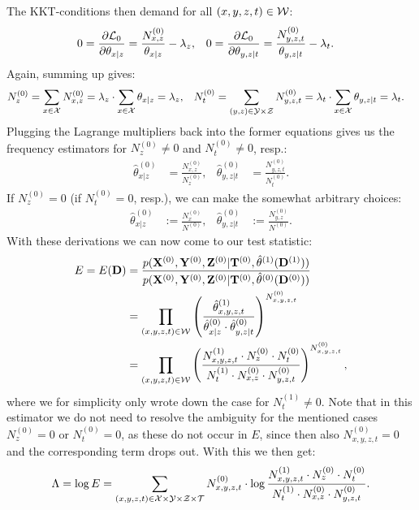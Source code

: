 The KKT-conditions then demand for all $(x,y,z,t) \in \mathcal{W}$:
\begin{align*}
    0= \frac{\partial \mathcal{L}_0}{\partial\theta_{x|z}} &= \frac{N_{x,z}^{(0)}}{\theta_{x|z}}  - \lambda_z, &
    0= \frac{\partial \mathcal{L}_0}{\partial\theta_{y,z|t}} &= \frac{N_{y,z,t}^{(0)}}{\theta_{y,z|t}}  - \lambda_t.
\end{align*}
Again, summing up gives:
\begin{align*}
    N_z^{(0)} &= \sum_{x \in \mathcal{X}} N_{x,z}^{(0)} = \lambda_z \cdot \sum_{x \in \mathcal{X}} \theta_{x|z} = \lambda_z, &
    N_t^{(0)} &= \sum_{(y,z) \in\mathcal{Y}\times\mathcal{Z}} N_{y,z,t}^{(0)} = \lambda_t \cdot \sum_{x \in \mathcal{X}} \theta_{y,z|t} = \lambda_t.
\end{align*}
Plugging the Lagrange multipliers back into the former equations gives us the frequency estimators
for $N_z^{(0)} \neq 0$ and $N_t^{(0)} \neq 0$, resp.:
\begin{align*}
    \hat \theta_{x|z}^{(0)} & = \frac{N_{x,z}^{(0)}}{N_z^{(0)}}, & \hat \theta_{y,z|t}^{(0)} & = \frac{N_{y,z,t}^{(0)}}{N_t^{(0)}}.
\end{align*}
If $N_z^{(0)} =0$ (if $N_t^{(0)} =0$, resp.), we can make the somewhat arbitrary choices:
\begin{align*}
    \hat \theta_{x|z}^{(0)} & := \frac{N_{x}^{(0)}}{N^{(0)}}, & \hat \theta_{y,z|t}^{(0)} & := \frac{N_{y,z}^{(0)}}{N^{(0)}}.
\end{align*}
With these derivations we can now come to our test statistic:
\begin{align*}
    E = E(\mathbf{D}) 
      &= \frac{ p(\mathbf{X}^{(0)},\mathbf{Y}^{(0)},\mathbf{Z}^{(0)}|\mathbf{T}^{(0)},\hat\theta^{(1)}(\mathbf{D}^{(1)})) }{p(\mathbf{X}^{(0)},\mathbf{Y}^{(0)},\mathbf{Z}^{(0)}|\mathbf{T}^{(0)},\hat\theta^{(0)}(\mathbf{D}^{(0)}))}\\
   &= \prod_{(x,y,z,t) \in \mathcal{W}} \left (  \frac{\hat\theta^{(1)}_{x,y,z,t} }{ \hat\theta^{(0)}_{x|z} \cdot \hat\theta^{(0)}_{y,z|t}} \right )^{N^{(0)}_{x,y,z,t}} \\
   &= \prod_{(x,y,z,t) \in \mathcal{W}} \left ( \frac{N_{x,y,z,t}^{(1)} \cdot N_z^{(0)} \cdot N_t^{(0)}}{N_{t}^{(1)} \cdot N_{x,z}^{(0)} \cdot N_{y,z,t}^{(0)} } \right )^{N^{(0)}_{x,y,z,t}},
\end{align*}
where we for simplicity only wrote down the case for $N_{t}^{(1)} \neq 0$. Note that in this estimator we do not need to resolve the ambiguity 
for the mentioned cases $N_z^{(0)} =0$ or $N_t^{(0)} =0$, as these do not occur in $E$, since then also $N^{(0)}_{x,y,z,t}=0$ and the corresponding term drops out.
With this we then get:
\begin{align*}
    \Lambda = \log E = \sum_{(x,y,z,t) \in \mathcal{X}\times\mathcal{Y}\times\mathcal{Z}\times\mathcal{T}}  N^{(0)}_{x,y,z,t} \cdot  \log \frac{N_{x,y,z,t}^{(1)} \cdot N_z^{(0)} \cdot N_t^{(0)}}{N_{t}^{(1)} \cdot N_{x,z}^{(0)} \cdot N_{y,z,t}^{(0)}}.
\end{align*}

